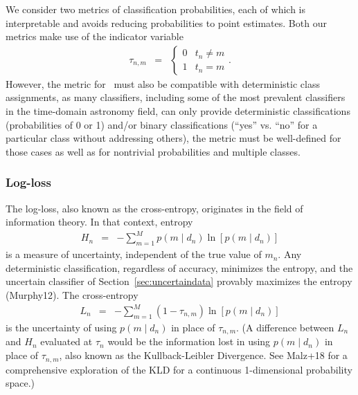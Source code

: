 We consider two  metrics of classification probabilities, each of which is interpretable and avoids reducing probabilities to point estimates.
Both our metrics make use of the indicator variable
\begin{eqnarray}
  \label{eq:indicator}
  \tau_{n, m} &=& \begin{cases}
  0 & t_{n} \neq m\\
  1 & t_{n} = m
  \end{cases}.
\end{eqnarray}
However, the metric for \plasticc\ must also be compatible with deterministic class assignments, as many classifiers, including some of the most prevalent classifiers in the time-domain astronomy field, can only provide deterministic classifications (probabilities of 0 or 1) and/or binary classifications (``yes'' vs. ``no'' for a particular class without addressing others), the metric must be well-defined for those cases as well as for nontrivial probabilities and multiple classes.


\subsubsection{Log-loss}
\label{sec:logloss}

The log-loss, also known as the cross-entropy, originates in the field of information theory.
In that context, entropy
\begin{eqnarray}
  \label{eq:entropy}
  H_{n} &=& -\sum_{m=1}^{M}p(m \mid d_{n})\ln[p(m \mid d_{n})]
\end{eqnarray}
is a measure of uncertainty, independent of the true value of $m_{n}$.
Any deterministic classification, regardless of accuracy, minimizes the entropy, and the uncertain classifier of Section~\ref{sec:uncertaindata} provably maximizes the entropy (Murphy12).
The cross-entropy
\begin{eqnarray}
  \label{eq:logloss}
  L_{n} &=& -\sum_{m=1}^{M}(1-\tau_{n, m})\ln[p(m \mid d_{n})]
\end{eqnarray}
is the uncertainty of using $p(m \mid d_{n})$ in place of $\tau_{n, m}$.
(A difference between $L_{n}$ and $H_{n}$ evaluated at $\tau_{n}$ would be the information lost in using $p(m \mid d_{n})$ in place of $\tau_{n, m}$, also known as the Kullback-Leibler Divergence.
See Malz+18 for a comprehensive exploration of the KLD for a continuous 1-dimensional probability space.)

